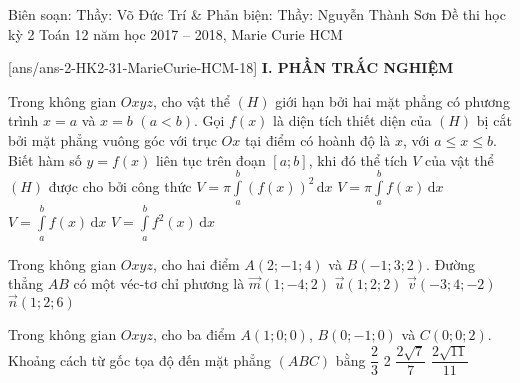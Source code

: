 	\begin{name}
{Biên soạn: Thầy: Võ Đức Trí \& Phản biện: Thầy: Nguyễn Thành Sơn}
		{Đề thi học kỳ 2 Toán 12 năm học 2017 – 2018, Marie Curie HCM}
	\end{name}
	\setcounter{ex}{0}\setcounter{bt}{0}
	[ans/ans-2-HK2-31-MarieCurie-HCM-18]
\noindent\textbf{I. PHẦN TRẮC NGHIỆM}
\begin{ex}%
Trong không gian $Oxyz$, cho vật thể $(H)$ giới hạn bởi hai mặt phẳng có phương trình $ x=a$ và $x=b$ $(a<b)$. Gọi $f(x)$ là diện tích thiết diện của $(H)$ bị cắt bởi mặt phẳng vuông góc với trục $Ox$ tại điểm có hoành độ là $x$, với $a\le x \le b.$ Biết hàm số $y=f(x)$ liên tục trên đoạn $[a;b]$, khi đó thể tích $V$ của vật thể $(H)$ được cho bởi công thức
\choice
{$V=\pi \displaystyle\int\limits_a^b (f(x))^2 \mathrm{\,d}x$}
{$V=\pi \displaystyle\int\limits_a^b f(x) \mathrm{\,d}x$}
{\True $V=\displaystyle\int\limits_a^b f(x) \mathrm{\,d}x$}
{$V=\displaystyle\int\limits_a^b f^2(x)\mathrm{\,d}x$}
\end{ex}

\begin{ex}%
Trong không gian $Oxyz$, cho hai điểm $A(2;-1;4)$ và $B(-1;3;2)$. Đường thẳng $AB$ có một véc-tơ chỉ phương là
\choice
{$\overrightarrow{m}(1;-4;2)$}
{$\overrightarrow{u}(1;2;2)$}
{\True $\overrightarrow{v}(-3;4;-2)$}
{$\overrightarrow{n}(1;2;6)$}
\end{ex}

\begin{ex}%
Trong không gian $Oxyz$, cho ba điểm $A(1;0;0)$, $B(0;-1;0)$ và $C(0;0;2)$. Khoảng cách từ gốc tọa độ đến mặt phẳng $(ABC)$ bằng
\choice
{\True $	\dfrac{2}{3}$}
{2}
{$\dfrac{2\sqrt{7}}{7}$}
{$\dfrac{2\sqrt{11}}{11}$}
\end{ex}

